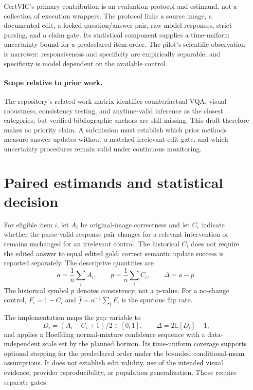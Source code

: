 \documentclass[10pt]{article}
\begin{document}
CertVIC's primary contribution is an evaluation protocol and estimand, not a collection
of execution wrappers. The protocol links a source image, a documented edit, a locked
question/answer pair, raw model responses, strict parsing, and a claim gate. Its
statistical component supplies a time-uniform uncertainty bound for a predeclared item
order. The pilot's scientific observation is narrower: responsiveness and specificity
are empirically separable, and specificity is model dependent on the available control.

\paragraph{Scope relative to prior work.}
The repository's related-work matrix identifies counterfactual VQA, visual robustness,
consistency testing, and anytime-valid inference as the closest categories, but verified
bibliographic anchors are still missing. This draft therefore makes no priority claim.
A submission must establish which prior methods measure answer updates without a
matched irrelevant-edit gate, and which uncertainty procedures remain valid under
continuous monitoring.

\section{Paired estimands and statistical decision}

For eligible item $i$, let $A_i$ be original-image correctness and let $C_i$ indicate
whether the parse-valid response pair changes for a relevant intervention or remains
unchanged for an irrelevant control. The historical $C_i$ does not require the edited
answer to equal edited gold; correct semantic update success is reported separately.
The descriptive quantities are
\begin{equation}
 a=\frac{1}{n}\sum_i A_i,\qquad
 p=\frac{1}{n}\sum_i C_i,\qquad
 \Delta=a-p.
\end{equation}
The historical symbol $p$ denotes consistency, not a p-value. For a no-change control,
$F_i=1-C_i$ and $\hat f=n^{-1}\sum_i F_i$ is the spurious flip rate.

The implementation maps the gap variable to
\begin{equation}
 D_i=(A_i-C_i+1)/2\in[0,1],\qquad
 \Delta=2\mathbb{E}[D_i]-1,
\end{equation}
and applies a Hoeffding normal-mixture confidence sequence with a data-independent scale
set by the planned horizon. Its time-uniform coverage supports optional stopping for the
predeclared order under the bounded conditional-mean assumptions. It does not establish
edit validity, use of the intended visual evidence, provider reproducibility, or population
generalization. Those require separate gates.
\end{document}
